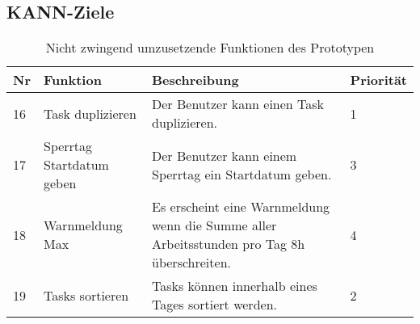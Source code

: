 \subsection{KANN-Ziele}
\begin{table}[!ht]
\begin{center}
    \begin{tabular}{llp{8cm}l}
        \toprule Nr & Funktion & Beschreibung & Priorität \\
        \midrule 16 & Task duplizieren & Der Benutzer kann einen Task duplizieren. & 1\\
        \midrule 17 & Sperrtag Startdatum geben & Der Benutzer kann einem Sperrtag ein Startdatum geben. &  3\\ 
        \midrule 18 & Warnmeldung Max & Es erscheint eine Warnmeldung wenn die Summe aller Arbeitsstunden pro Tag 8h überschreiten. & 4\\
        \midrule 19 & Tasks sortieren & Tasks können innerhalb eines Tages sortiert werden. & 2\\
        \bottomrule
    \end{tabular}
    \caption{Nicht zwingend umzusetzende Funktionen des Prototypen}
    \label{tab:kann_funktionen}
\end{center}
\end{table}

% 
